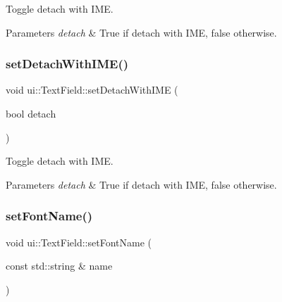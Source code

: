 Toggle detach with I\+ME. 


\begin{DoxyParams}{Parameters}
{\em detach} & True if detach with I\+ME, false otherwise. \\
\hline
\end{DoxyParams}
\mbox{\label{classui_1_1TextField_accfce2b8fdc0f2ae95e3f07dabd9f292}} 
\subsubsection{\texorpdfstring{set\+Detach\+With\+I\+M\+E()}{setDetachWithIME()}\hspace{0.1cm}{\footnotesize\ttfamily [2/2]}}
{\footnotesize\ttfamily void ui\+::\+Text\+Field\+::set\+Detach\+With\+I\+ME (\begin{DoxyParamCaption}\item[{bool}]{detach }\end{DoxyParamCaption})}



Toggle detach with I\+ME. 


\begin{DoxyParams}{Parameters}
{\em detach} & True if detach with I\+ME, false otherwise. \\
\hline
\end{DoxyParams}
\mbox{\label{classui_1_1TextField_a0dc06b592621a2867e5e91cea01470db}} 
\subsubsection{\texorpdfstring{set\+Font\+Name()}{setFontName()}\hspace{0.1cm}{\footnotesize\ttfamily [1/2]}}
{\footnotesize\ttfamily void ui\+::\+Text\+Field\+::set\+Font\+Name (\begin{DoxyParamCaption}\item[{const std\+::string \&}]{name }\end{DoxyParamCaption})}



